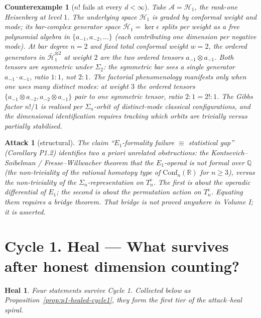 \documentclass[11pt]{article}
\newtheorem*{attack}{Attack}
\newtheorem*{heal}{Heal}
\newtheorem*{counterexample}{Counterexample}
\theoremstyle{definition}
\begin{document}
\begin{counterexample}[\(n!\) fails at every $d < \infty$]
Take $\mathcal{A} = \mathcal{H}_1$, the rank-one Heisenberg at level $1$.
The underlying space $\mathcal{H}_1$ is graded by conformal weight and
mode; its bar-complex generator space $\bar{\mathcal{H}}_1 =
\ker\epsilon$ splits per weight as a free polynomial algebra in
$\{a_{-1}, a_{-2}, \dots\}$ (each contributing one dimension per
negative mode). At bar degree $n = 2$ and fixed total conformal weight
$w = 2$, the ordered generators in $\bar{\mathcal{H}}_1^{\otimes 2}$ at
weight $2$ are the two ordered tensors $a_{-1} \otimes a_{-1}$. Both
tensors are symmetric under $\Sigma_2$: the symmetric bar sees a single
generator $a_{-1} \cdot a_{-1}$, ratio $1 : 1$, not $2 : 1$. The
factorial phenomenology manifests only when one uses many \emph{distinct}
modes: at weight $3$ the ordered tensors $\{a_{-1} \otimes a_{-2},
a_{-2} \otimes a_{-1}\}$ pair to one symmetric tensor, ratio $2 : 1 = 2!
: 1$. The Gibbs factor $n!/1$ is realised per $\Sigma_n$-orbit of
\emph{distinct-mode} classical configurations, and the dimensional
identification requires tracking which orbits are trivially versus
partially stabilised.
\end{counterexample}

\begin{attack}[structural]
The claim ``$E_1$-formality failure $\equiv$ statistical gap''
(Corollary P1.2) identifies two a priori unrelated obstructions: the
Kontsevich--Soibelman / Fresse--Willwacher theorem that the
$E_1$-operad is \emph{not} formal over $\mathbb Q$ (the non-triviality
of the rational homotopy type of $\mathrm{Conf}_n(\mathbb{R})$ for $n \ge
3$), versus the non-triviality of the $\Sigma_n$-representation on
$T^c_n$. The first is about the operadic differential of $E_1$; the
second is about the permutation action on $T^c_n$. Equating them
requires a \emph{bridge theorem}. That bridge is not proved anywhere in
Volume I; it is asserted.
\end{attack}

\section*{Cycle 1. Heal --- What survives after honest dimension counting?}

\begin{heal}
Four statements survive Cycle 1. Collected below as Proposition~\ref{prop:p1-healed-cycle1},
they form the first tier of the attack--heal spiral.
\end{heal}
\end{document}
